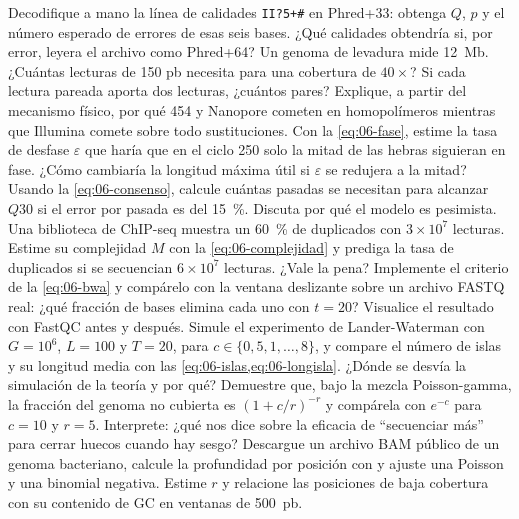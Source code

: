 \begin{ejercicios}
 Decodifique a mano la línea de calidades \texttt{II?5+\#} en Phred+33: obtenga $Q$, $p$ y el número esperado de errores de esas seis bases. ¿Qué calidades obtendría si, por error, leyera el archivo como Phred+64?
 Un genoma de levadura mide \SI{12}{Mb}. ¿Cuántas lecturas de 150 pb necesita para una cobertura de $40\times$? Si cada lectura pareada aporta dos lecturas, ¿cuántos pares?
 Explique, a partir del mecanismo físico, por qué 454 y Nanopore cometen  en homopolímeros mientras que Illumina comete sobre todo sustituciones.
 Con la \cref{eq:06-fase}, estime la tasa de desfase $\varepsilon$ que haría que en el ciclo 250 solo la mitad de las hebras siguieran en fase. ¿Cómo cambiaría la longitud máxima útil si $\varepsilon$ se redujera a la mitad?
 Usando la \cref{eq:06-consenso}, calcule cuántas pasadas se necesitan para alcanzar $Q30$ si el error por pasada es del \SI{15}{\percent}. Discuta por qué el modelo es pesimista.
 Una biblioteca de ChIP-seq muestra un \SI{60}{\percent} de duplicados con $3\times10^7$ lecturas. Estime su complejidad $M$ con la \cref{eq:06-complejidad} y prediga la tasa de duplicados si se secuencian $6\times10^7$ lecturas. ¿Vale la pena?
 Implemente el criterio de la \cref{eq:06-bwa} y compárelo con la ventana deslizante sobre un archivo FASTQ real: ¿qué fracción de bases elimina cada uno con $t=20$? Visualice el resultado con FastQC antes y después.
 Simule el experimento de Lander-Waterman con $G=10^6$, $L=100$ y $T=20$, para $c\in\{0{,}5,1,\dots,8\}$, y compare el número de islas y su longitud media con las \cref{eq:06-islas,eq:06-longisla}. ¿Dónde se desvía la simulación de la teoría y por qué?
 Demuestre que, bajo la mezcla Poisson-gamma, la fracción del genoma no cubierta es $\left(1+c/r\right)^{-r}$ y compárela con $e^{-c}$ para $c=10$ y $r=5$. Interprete: ¿qué nos dice sobre la eficacia de ``secuenciar más'' para cerrar huecos cuando hay sesgo?
 Descargue un archivo BAM público de un genoma bacteriano, calcule la profundidad por posición con  y ajuste una Poisson y una binomial negativa. Estime $r$ y relacione las posiciones de baja cobertura con su contenido de GC en ventanas de \SI{500}{pb}.
\end{ejercicios}

